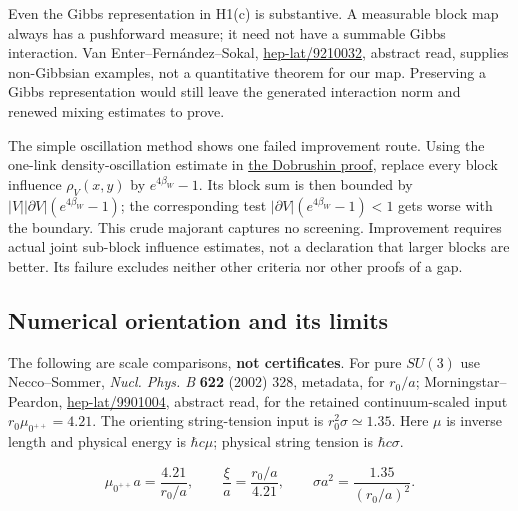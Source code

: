 \documentclass[11pt,a4paper]{article}
\begin{document}
Even the Gibbs representation in H1(c) is substantive. A measurable
block map always has a pushforward measure; it need not have a summable
Gibbs interaction. Van Enter--Fernández--Sokal,
\href{https://arxiv.org/abs/hep-lat/9210032}{hep-lat/9210032}, abstract
read, supplies non-Gibbsian examples, not a quantitative theorem for our
map. Preserving a Gibbs representation would still leave the generated
interaction norm and renewed mixing estimates to prove.

The simple oscillation method shows one failed improvement route. Using
the one-link density-oscillation estimate in
\href{dobrushin-uniqueness-wilson.md}{the Dobrushin proof}, replace
every block influence \(\rho_V(x,y)\) by \(e^{4\beta_W}-1\). Its block
sum is then bounded by \(|V||\partial V|(e^{4\beta_W}-1)\); the
corresponding test \(|\partial V|(e^{4\beta_W}-1)<1\) gets worse with
the boundary. This crude majorant captures no screening. Improvement
requires actual joint sub-block influence estimates, not a declaration
that larger blocks are better. Its failure excludes neither other
criteria nor other proofs of a gap.

\hypertarget{numerical-orientation-and-its-limits}{%
\subsection{Numerical orientation and its
limits}\label{numerical-orientation-and-its-limits}}

The following are scale comparisons, \textbf{not certificates}. For pure
\(SU(3)\) use Necco--Sommer, \emph{Nucl. Phys. B} \textbf{622} (2002)
328, metadata, for \(r_0/a\); Morningstar--Peardon,
\href{https://arxiv.org/abs/hep-lat/9901004}{hep-lat/9901004}, abstract
read, for the retained continuum-scaled input \(r_0\mu_{0^{++}}=4.21\).
The orienting string-tension input is \(r_0^2\sigma\simeq1.35\). Here
\(\mu\) is inverse length and physical energy is \(\hbar c\mu\);
physical string tension is \(\hbar c\sigma\).

\[\mu_{0^{++}}a=\frac{4.21}{r_0/a},\qquad
 \frac\xi a=\frac{r_0/a}{4.21},\qquad
 \sigma a^2=\frac{1.35}{(r_0/a)^2}.\]
\end{document}
